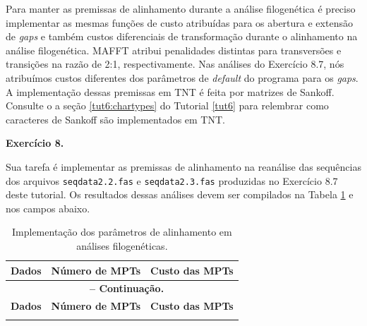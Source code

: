 \begin{refsection}
Para manter as premissas de alinhamento durante a análise filogenética é preciso implementar as mesmas funções de custo atribuídas para os abertura e extensão de \textit{gaps} e também custos diferenciais de transformação durante o alinhamento na análise filogenética. MAFFT atribui penalidades distintas para transversões e transições na razão de 2:1, respectivamente. Nas análises do Exercício 8.7, nós atribuímos custos diferentes dos parâmetros de \textit{default} do programa para os \textit{gaps}. A implementação dessas premissas em TNT é feita por matrizes de Sankoff. Consulte o a seção \ref{tut6:chartypes} do Tutorial \ref{tut6} para relembrar como caracteres de Sankoff são implementados em TNT.\\

\begin{blackBlock}{\textbf{Exercício 8.}}\label{tut8:ex:8.9}

Sua tarefa é implementar as premissas de alinhamento na reanálise das sequências dos arquivos \texttt{seqdata2.2.fas} e \texttt{seqdata2.3.fas} produzidas no Exercício 8.7 deste tutorial. Os resultados dessas análises devem ser compilados na Tabela \ref{tut8:table:implement} e nos campos abaixo.

\end{blackBlock}




\pagestyle{fancy}
\begin{center}

\begin{longtable}{|c|c|c|}
\caption[Implementação dos parâmetros de alinhamento em análises filogenéticas]{Implementação dos parâmetros de alinhamento em análises filogenéticas.} \label{tut8:table:implement} \\


\hline\hline \textbf{Dados} & \textbf{Número de MPTs}  & \textbf{Custo das MPTs}\\
\endfirsthead

\multicolumn{3}{c}{{\bfseries \tablename\ \thetable{} -- Continuação.}}\\
\hline\hline \textbf{Dados} & \textbf{Número de MPTs} & \textbf{Custo das MPTs}\\
\endhead
\hline \hline
\endlastfoot


\end{longtable}
\end{center}
\end{refsection}
